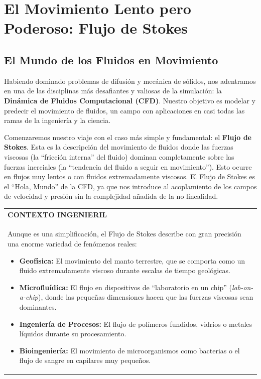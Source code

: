\chapter{El Movimiento Lento pero Poderoso: Flujo de Stokes}
\label{chap:stokes}

\section{El Mundo de los Fluidos en Movimiento}
Habiendo dominado problemas de difusión y mecánica de sólidos, nos adentramos en una de las disciplinas más desafiantes y valiosas de la simulación: la \textbf{Dinámica de Fluidos Computacional (CFD)}. Nuestro objetivo es modelar y predecir el movimiento de fluidos, un campo con aplicaciones en casi todas las ramas de la ingeniería y la ciencia.

Comenzaremos nuestro viaje con el caso más simple y fundamental: el \textbf{Flujo de Stokes}. Esta es la descripción del movimiento de fluidos donde las fuerzas viscosas (la ``fricción interna'' del fluido) dominan completamente sobre las fuerzas inerciales (la ``tendencia del fluido a seguir en movimiento''). Esto ocurre en flujos muy lentos o con fluidos extremadamente viscosos. El Flujo de Stokes es el ``Hola, Mundo'' de la CFD, ya que nos introduce al acoplamiento de los campos de velocidad y presión sin la complejidad añadida de la no linealidad.

\begin{center}
\begin{tabular}{|p{}|}
\hline
\textbf{CONTEXTO INGENIERIL} \\
Aunque es una simplificación, el Flujo de Stokes describe con gran precisión una enorme variedad de fenómenos reales:
\begin{itemize}
    \item \textbf{Geofísica:} El movimiento del manto terrestre, que se comporta como un fluido extremadamente viscoso durante escalas de tiempo geológicas.
    \item \textbf{Microfluídica:} El flujo en dispositivos de ``laboratorio en un chip'' (\textit{lab-on-a-chip}), donde las pequeñas dimensiones hacen que las fuerzas viscosas sean dominantes.
    \item \textbf{Ingeniería de Procesos:} El flujo de polímeros fundidos, vidrios o metales líquidos durante su procesamiento.
    \item \textbf{Bioingeniería:} El movimiento de microorganismos como bacterias o el flujo de sangre en capilares muy pequeños.
\end{itemize}
\\
\hline
\end{tabular}
\end{center}

